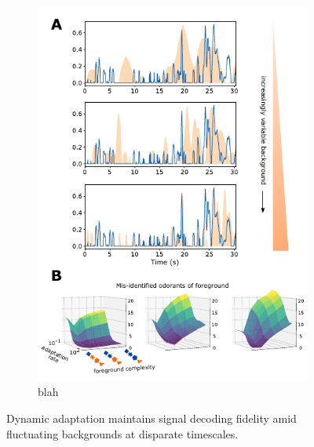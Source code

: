 


\begin{figure}[!tb]
	\begin{subfigure}[t]{\linewidth}
		\includegraphics[width=\textwidth]{figures/Figures_temporal_coding_2}
		\caption{blah}
		\label{fig:temporal_coding_2_a}	
	\end{subfigure}
	\begin{subfigure}[t]{0\linewidth}
		\label{fig:temporal_coding_2_b}
	\end{subfigure}
	\begin{subfigure}[t]{0\linewidth}
		\label{fig:temporal_coding_2_c}
	\end{subfigure}
	\caption{Dynamic adaptation maintains signal decoding fidelity amid fluctuating backgrounds at disparate timescales.}
	\label{fig:temporal_coding_2}
\end{figure}


